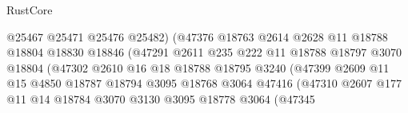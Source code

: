 \begin{lexlean}{RustCore}
\begin{coremodule}
                                        @25467
                                        @25471
                                        @25476
                                        @25482)
                                      (@47376
                                        @18763
                                        @2614
                                        @2628
                                        @11
                                        @18788
                                        @18804
                                        @18830
                                        @18846
                                        (@47291
                                          @2611
                                          @235
                                          @222
                                          @11
                                          @18788
                                          @18797
                                          @3070
                                          @18804
                                          (@47302
                                            @2610
                                            @16
                                            @18
                                            @18788
                                            @18795
                                            @3240
                                            (@47399
                                              @2609
                                              @11
                                              @15
                                              @4850
                                              @18787
                                              @18794
                                              @3095
                                              @18768
                                              @3064
                                              @47416
                                              (@47310
                                                @2607
                                                @177
                                                @11
                                                @14
                                                @18784
                                                @3070
                                                @3130
                                                @3095
                                                @18778
                                                @3064
                                                (@47345

\end{coremodule}
\end{lexlean}
